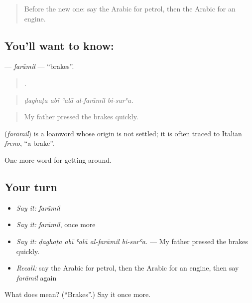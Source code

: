 \begin{quote}
Before the new one: say the Arabic for petrol, then the Arabic for an engine.
\end{quote}

\subsection*{You'll want to know: }
\textbf{} — \emph{farāmil} — \textquotedblleft{}brakes\textquotedblright{}.

\begin{quote}
    .
\end{quote}

\begin{quote}
\emph{ḍaghaṭa abī ʿalā al-farāmil bi-surʿa.}
\end{quote}

\begin{quote}
My father pressed the brakes quickly.
\end{quote}

\begin{cousinweb}
\textbf{} (\emph{farāmil}) is a loanword whose origin is not settled; it is often traced to Italian \emph{freno}, \textquotedblleft{}a brake\textquotedblright{}.
\end{cousinweb}

\begin{grammarlens}[title={What you've built}]
One more word for getting around.
\end{grammarlens}

\subsection*{Your turn}
\begin{itemize}
\raggedright
  \item \emph{Say it:} \emph{farāmil}
  \item \emph{Say it:} \emph{farāmil}, once more
  \item \emph{Say it:} \emph{ḍaghaṭa abī ʿalā al-farāmil bi-surʿa.} — My father pressed the brakes quickly.
  \item \emph{Recall:} say the Arabic for petrol, then the Arabic for an engine, then say \emph{farāmil} again
\end{itemize}

\begin{tcolorbox}[breakable,colback=teal!4,colframe=teal!35!black,title={Before you move on}]
What does  mean? (\textquotedblleft{}Brakes\textquotedblright{}.) Say it once more.
\end{tcolorbox}
